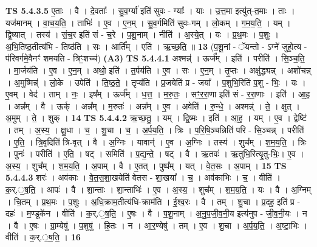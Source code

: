 \documentclass[17pt]{extarticle}
\begin{document}
                  \newline
                                \textbf{ TS 5.4.3.5} \newline
                  ए॒ताः । वै । दे॒वताः᳚ । सु॒व॒र्ग्या॑ इति॑ सुवः - ग्याः᳚ । याः । उ॒त्त॒मा इत्यु॑त्-त॒माः । ताः । यज॑मानम् । वा॒च॒य॒ति॒ । ताभिः॑ । ए॒व । ए॒न॒म् । सु॒व॒र्गमिति॑ सुवः-गम् । लो॒कम् । ग॒म॒य॒ति॒ । यम् । द्वि॒ष्यात् । तस्य॑ । सं॒च॒र इति॑ सं - च॒रे । प॒शू॒नाम् । नीति॑ । अ॒स्ये॒त् । यः । प्र॒थ॒मः । प॒शुः । अ॒भि॒तिष्ठ॒तीत्य॑भि - तिष्ठ॑ति । सः । आर्ति᳚म् । एति॑ । ऋ॒च्छ॒ति॒ ॥ \textbf{  13 } \newline
                  \newline
                      (प॒शू॒नां - ॅयन्तो - ऽग्ने॑ जुहो॒त्य - प॑रिवर्गमे॒वैनꣳ॑ शमयति - त्रिꣳ॒॒शच्च॑)  \textbf{(A3)} \newline \newline
                                \textbf{ TS 5.4.4.1} \newline
                  अश्मन्न्॑ । ऊर्ज᳚म् । इति॑ । परीति॑ । सि॒ञ्च॒ति॒ । मा॒र्जय॑ति । ए॒व । ए॒न॒म् । अथो॒ इति॑ । त॒र्पय॑ति । ए॒व । सः । ए॒न॒म् । तृ॒प्तः । अक्षु॑द्ध्यन्न् । अशो॑चन्न् । अ॒मुष्मिन्न्॑ । लो॒के । उपेति॑ । ति॒ष्ठ॒ते॒ । तृप्य॑ति । प्र॒जयेति॑ प्र - जया᳚ । प॒शुभि॒रिति॑ प॒शु - भिः॒ । यः । ए॒वम् । वेद॑ । ताम् । नः॒ । इष᳚म् । ऊर्ज᳚म् । ध॒त्त॒ । म॒रु॒तः॒ । सꣳ॒॒र॒रा॒णा इति॑ सं - र॒रा॒णाः । इति॑ । आ॒ह॒ । अन्न᳚म् । वै । ऊर्क् । अन्न᳚म् । म॒रुतः॑ । अन्न᳚म् । ए॒व । अवेति॑ । रु॒न्धे॒ । अश्मन्न्॑ । ते॒ । क्षुत् । अ॒मुम् । ते॒ । शुक् । \textbf{  14 } \newline
                  \newline
                                \textbf{ TS 5.4.4.2} \newline
                  ऋ॒च्छ॒तु॒ । यम् । द्वि॒ष्मः । इति॑ । आ॒ह॒ । यम् । ए॒व । द्वेष्टि॑ । तम् । अ॒स्य॒ । क्षु॒धा । च॒ । शु॒चा । च॒ । अ॒र्प॒य॒ति॒ । त्रिः । प॒रि॒षि॒ञ्चन्निति॑ परि - सि॒ञ्चन्न् । परीति॑ । ए॒ति॒ । त्रि॒वृदिति॑ त्रि-वृत् । वै । अ॒ग्निः । यावान्॑ । ए॒व । अ॒ग्निः । तस्य॑ । शुच᳚म् । श॒म॒य॒ति॒ । त्रिः । पुनः॑ । परीति॑ । ए॒ति॒ । षट् । समिति॑ । प॒द्य॒न्ते॒ । षट् । वै । ऋ॒तवः॑ । ऋ॒तुभि॒रित्यृ॒तु-भिः॒। ए॒व । अ॒स्य॒ । शुच᳚म् । श॒म॒य॒ति॒ । अ॒पाम् । वै । ए॒तत् । पुष्प᳚म् । यत् । वे॒त॒सः । अ॒पाम् । \textbf{  15} \newline
                  \newline
                                \textbf{ TS 5.4.4.3} \newline
                  शरः॑ । अव॑काः । वे॒त॒स॒शा॒खयेति॑ वेतस - शा॒खया᳚ । च॒ । अव॑काभिः । च॒ । वीति॑ । क॒र्.॒ष॒ति॒ । आपः॑ । वै । शा॒न्ताः । शा॒न्ताभिः॑ । ए॒व । अ॒स्य॒ । शुच᳚म् । श॒म॒य॒ति॒ । यः । वै । अ॒ग्निम् । चि॒तम् । प्र॒थ॒मः । प॒शुः । अ॒धि॒क्राम॒तीत्य॑धि-क्राम॑ति । ई॒श्व॒रः । वै । तम् । शु॒चा । प्र॒दह॒ इति॑ प्र - दहः॑ । म॒ण्डूके॑न । वीति॑ । क॒र्.॒ष॒ति॒ । ए॒षः । वै । प॒शू॒नाम् । अ॒नु॒प॒जी॒व॒नी॒य इत्य॑नुप -  जी॒व॒नी॒यः । न । वै । ए॒षः । ग्रा॒म्येषु॑ । प॒शुषु॑ । हि॒तः । न । आ॒र॒ण्येषु॑ । तम् । ए॒व । शु॒चा । अ॒र्प॒य॒ति॒ । अ॒ष्टा॒भिः । वीति॑ । क॒र्.॒ष॒ति॒ । \textbf{  16} \newline
\end{document}
